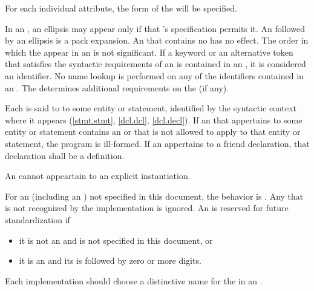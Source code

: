 \pnum
\begin{note}
For each individual attribute, the form of the
 will be specified.
\end{note}

\pnum
In an , an ellipsis may appear only if that
's specification permits it. An  followed
by an ellipsis is a pack expansion.
An  that contains no  has no
effect. The order in which the  appear in an
 is not significant. If a
keyword
or an alternative token that satisfies the syntactic requirements
of an  is
contained in
an , it is considered an identifier. No name
lookup is performed on any of the identifiers contained in an
. The  determines additional
requirements on the  (if any).

\pnum
Each  is said to  to some entity or
statement, identified by the syntactic context where it appears
(\ref{stmt.stmt}, \ref{dcl.dcl},
\ref{dcl.decl}). If an  that appertains to some
entity or statement contains an  or  that
is not allowed to apply to that
entity or statement, the program is ill-formed. If an 
appertains to a friend declaration, that declaration shall be a
definition.
\begin{note}
An  cannot appeartain to
an explicit instantiation.
\end{note}

\pnum
For an 
(including an )
not specified in this document, the
behavior is .
Any  that is not recognized by the implementation
is ignored.
An  is reserved for future standardization if
\begin{itemize}
\item it is not an  and
is not specified in this document, or
\item it is an  and
its  is
 followed by zero or more digits.
\end{itemize}
Each implementation should choose a distinctive name for the
 in an .

